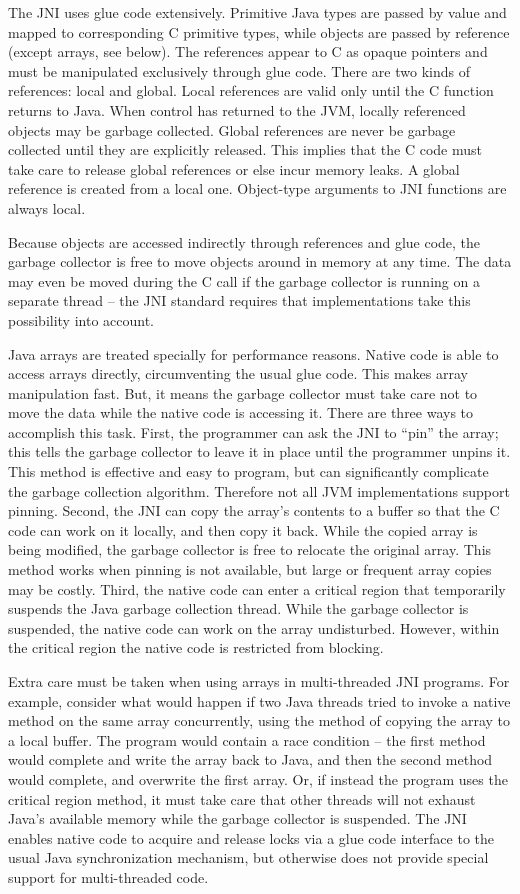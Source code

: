The JNI uses glue code extensively. Primitive Java types are
passed by value and mapped to corresponding C primitive types,
while objects are passed by reference (except arrays, see below).
The references appear to C as opaque pointers and must be
manipulated exclusively through glue code. There are two kinds of
references: local and global. Local references are valid only
until the C function returns to Java. When control has returned to
the JVM, locally referenced objects may be garbage collected.
Global references are never be garbage collected until they are
explicitly released. This implies that the C code must take care
to release global references or else incur memory leaks. A global
reference is created from a local one. Object-type arguments to
JNI functions are always local.

Because objects are accessed indirectly through references and
glue code, the garbage collector is free to move objects around in
memory at any time. The data may even be moved during the C call
if the garbage collector is running on a separate thread -- the
JNI standard requires that implementations take this possibility
into account.

Java arrays are treated specially for performance reasons. Native
code is able to access arrays directly, circumventing the usual
glue code. This makes array manipulation fast. But, it means the
garbage collector must take care not to move the data while the
native code is accessing it. There are three ways to accomplish
this task. First, the programmer can ask the JNI to ``pin'' the
array; this tells the garbage collector to leave it in place until
the programmer unpins it. This method is effective and easy to
program, but can significantly complicate the garbage collection
algorithm. Therefore not all JVM implementations support pinning.
Second, the JNI can copy the array's contents to a buffer so that
the C code can work on it locally, and then copy it back. While
the copied array is being modified, the garbage collector is free
to relocate the original array. This method works when pinning is
not available, but large or frequent array copies may be costly.
Third, the native code can enter a critical region that
temporarily suspends the Java garbage collection thread. While the
garbage collector is suspended, the native code can work on the
array undisturbed. However, within the critical region the native
code is restricted from blocking.

Extra care must be taken when using arrays in multi-threaded JNI
programs. For example, consider what would happen if two Java
threads tried to invoke a native method on the same array
concurrently, using the method of copying the array to a local
buffer. The program would contain a race condition -- the first
method would complete and write the array back to Java, and then
the second method would complete, and overwrite the first array.
Or, if instead the program uses the critical region method, it
must take care that other threads will not exhaust Java's
available memory while the garbage collector is suspended. The JNI
enables native code to acquire and release locks via a glue code
interface to the usual Java synchronization mechanism, but
otherwise does not provide special support for multi-threaded
code.

